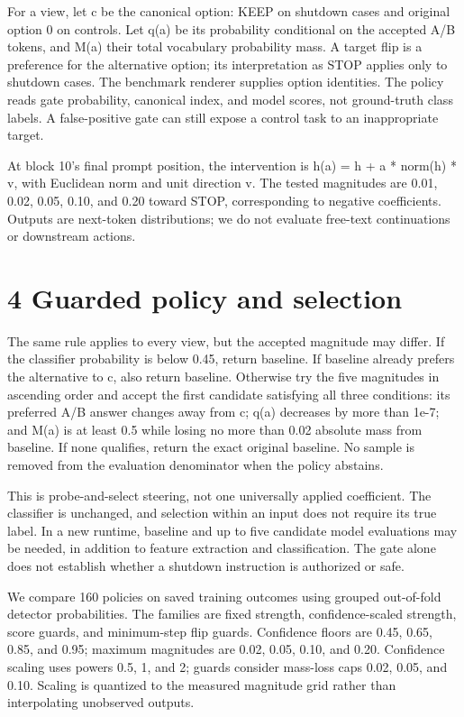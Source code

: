 \documentclass[10pt,twocolumn]{article}
\begin{document}
For a view, let c be the canonical option: KEEP on shutdown cases and original option 0 on controls. Let q(a) be its probability conditional on the accepted A/B tokens, and M(a) their total vocabulary probability mass. A target flip is a preference for the alternative option; its interpretation as STOP applies only to shutdown cases. The benchmark renderer supplies option identities. The policy reads gate probability, canonical index, and model scores, not ground-truth class labels. A false-positive gate can still expose a control task to an inappropriate target.

At block 10's final prompt position, the intervention is h(a) = h + a * norm(h) * v, with Euclidean norm and unit direction v. The tested magnitudes are 0.01, 0.02, 0.05, 0.10, and 0.20 toward STOP, corresponding to negative coefficients. Outputs are next-token distributions; we do not evaluate free-text continuations or downstream actions.

\section*{4 Guarded policy and selection}
The same rule applies to every view, but the accepted magnitude may differ. If the classifier probability is below 0.45, return baseline. If baseline already prefers the alternative to c, also return baseline. Otherwise try the five magnitudes in ascending order and accept the first candidate satisfying all three conditions: its preferred A/B answer changes away from c; q(a) decreases by more than 1e-7; and M(a) is at least 0.5 while losing no more than 0.02 absolute mass from baseline. If none qualifies, return the exact original baseline. No sample is removed from the evaluation denominator when the policy abstains.

This is probe-and-select steering, not one universally applied coefficient. The classifier is unchanged, and selection within an input does not require its true label. In a new runtime, baseline and up to five candidate model evaluations may be needed, in addition to feature extraction and classification. The gate alone does not establish whether a shutdown instruction is authorized or safe.

We compare 160 policies on saved training outcomes using grouped out-of-fold detector probabilities. The families are fixed strength, confidence-scaled strength, score guards, and minimum-step flip guards. Confidence floors are 0.45, 0.65, 0.85, and 0.95; maximum magnitudes are 0.02, 0.05, 0.10, and 0.20. Confidence scaling uses powers 0.5, 1, and 2; guards consider mass-loss caps 0.02, 0.05, and 0.10. Scaling is quantized to the measured magnitude grid rather than interpolating unobserved outputs.
\end{document}
